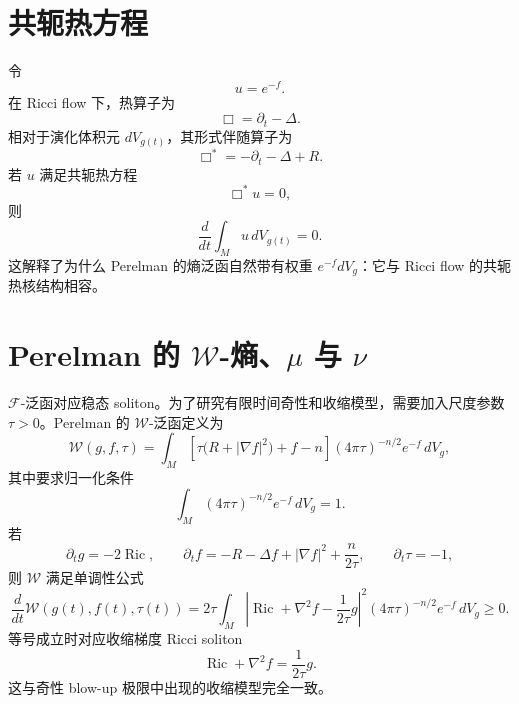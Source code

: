 \documentclass[11pt,a4paper,cn,nofont,math=cm,mode=fancy,bibtex]{elegantbook}
\numberwithin{equation}{chapter}
\numberwithin{figure}{chapter}
\newcommand{\Ric}{\operatorname{Ric}}
\newcommand{\norm}[1]{\left\lvert #1\right\rvert}
\begin{document}
\section{共轭热方程}

令
\begin{equation}\label{eq:u-from-f}
  u=e^{-f}.
\end{equation}
在 Ricci flow 下，热算子为
\[
  \Box=\partial_t-\Delta .
\]
相对于演化体积元 $dV_{g(t)}$，其形式伴随算子为
\begin{equation}\label{eq:conjugate-heat-operator}
  \Box^*=-\partial_t-\Delta+R .
\end{equation}
若 $u$ 满足共轭热方程
\begin{equation}\label{eq:conjugate-heat}
  \Box^*u=0,
\end{equation}
则
\[
  \frac{d}{dt}\int_M u\,dV_{g(t)}=0.
\]
这解释了为什么 Perelman 的熵泛函自然带有权重 $e^{-f}dV_g$：它与 Ricci flow 的共轭热核结构相容。

\section{Perelman 的 $\mathcal W$-熵、$\mu$ 与 $\nu$}

$\mathcal F$-泛函对应稳态 soliton。为了研究有限时间奇性和收缩模型，需要加入尺度参数 $\tau>0$。Perelman 的 $\mathcal W$-泛函定义为
\begin{equation}\label{eq:W-functional}
  \mathcal W(g,f,\tau)
  =\int_M \left[\tau\bigl(R+\norm{\nabla f}^2\bigr)+f-n\right](4\pi\tau)^{-n/2}e^{-f}\,dV_g,
\end{equation}
其中要求归一化条件
\begin{equation}\label{eq:W-normalization}
  \int_M(4\pi\tau)^{-n/2}e^{-f}\,dV_g=1.
\end{equation}
若
\begin{equation}\label{eq:W-system}
  \partial_tg=-2\Ric,
  \qquad
  \partial_tf=-R-\Delta f+\norm{\nabla f}^2+\frac{n}{2\tau},
  \qquad
  \partial_t\tau=-1,
\end{equation}
则 $\mathcal W$ 满足单调性公式
\begin{equation}\label{eq:W-monotonicity}
  \frac{d}{dt}\mathcal W(g(t),f(t),\tau(t))
  =2\tau\int_M
  \norm{\Ric+\nabla^2f-\frac{1}{2\tau}g}^2
  (4\pi\tau)^{-n/2}e^{-f}\,dV_g
  \ge0 .
\end{equation}
等号成立时对应收缩梯度 Ricci soliton
\begin{equation}\label{eq:shrinking-soliton-eq}
  \Ric+\nabla^2 f=\frac{1}{2\tau}g .
\end{equation}
这与奇性 blow-up 极限中出现的收缩模型完全一致。
\end{document}
